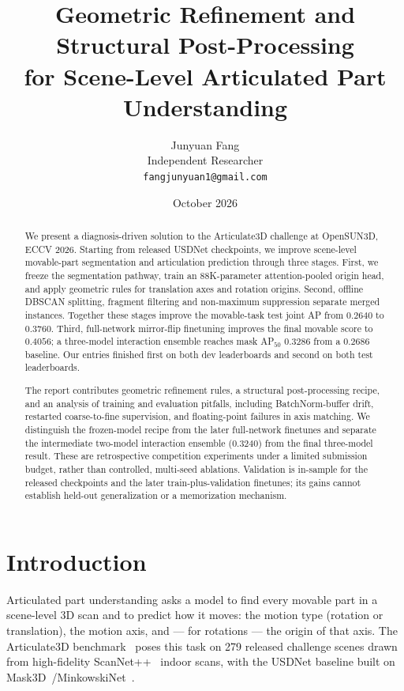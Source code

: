 \documentclass[11pt]{article}
\title{Geometric Refinement and Structural Post-Processing\\
for Scene-Level Articulated Part Understanding}
\author{
  Junyuan Fang\\
  Independent Researcher\\
  \texttt{fangjunyuan1@gmail.com}
}
\date{October 2026}
\begin{document}
\maketitle

\begin{abstract}
We present a diagnosis-driven solution to the Articulate3D challenge at
OpenSUN3D, ECCV 2026. Starting from released USDNet checkpoints, we improve
scene-level movable-part segmentation and articulation prediction through
three stages. First, we freeze the segmentation pathway, train an
88K-parameter attention-pooled origin head, and apply geometric rules for
translation axes and rotation origins. Second, offline DBSCAN splitting,
fragment filtering and non-maximum suppression separate merged instances.
Together these stages improve the movable-task test joint AP from $0.2640$
to $0.3760$. Third, full-network mirror-flip finetuning improves the final
movable score to $\mathbf{0.4056}$; a three-model interaction ensemble reaches
mask AP$_{50}$ $\mathbf{0.3286}$ from a $0.2686$ baseline. Our entries finished
first on both dev leaderboards and second on both test leaderboards.

The report contributes geometric refinement rules, a structural
post-processing recipe, and an analysis of training and evaluation pitfalls,
including BatchNorm-buffer drift, restarted coarse-to-fine supervision, and
floating-point failures in axis matching. We distinguish the frozen-model
recipe from the later full-network finetunes and separate the intermediate
two-model interaction ensemble ($0.3240$) from the final three-model result.
These are retrospective competition experiments under a limited submission
budget, rather than controlled, multi-seed ablations. Validation is in-sample
for the released checkpoints and the later train-plus-validation finetunes;
its gains cannot establish held-out generalization or a memorization mechanism.
\end{abstract}

\section{Introduction}

Articulated part understanding asks a model to find every movable part in a
scene-level 3D scan and to predict how it moves: the motion type (rotation or
translation), the motion axis, and --- for rotations --- the origin of that
axis. The Articulate3D benchmark~\cite{halacheva2025articulate3d} poses this
task on 279 released challenge scenes drawn from high-fidelity ScanNet++~\cite{yeshwanth2023scannetpp} indoor
scans, with the USDNet baseline built on
Mask3D~\cite{schult2023mask3d}/MinkowskiNet~\cite{choy2019minkowski}.
\end{document}
